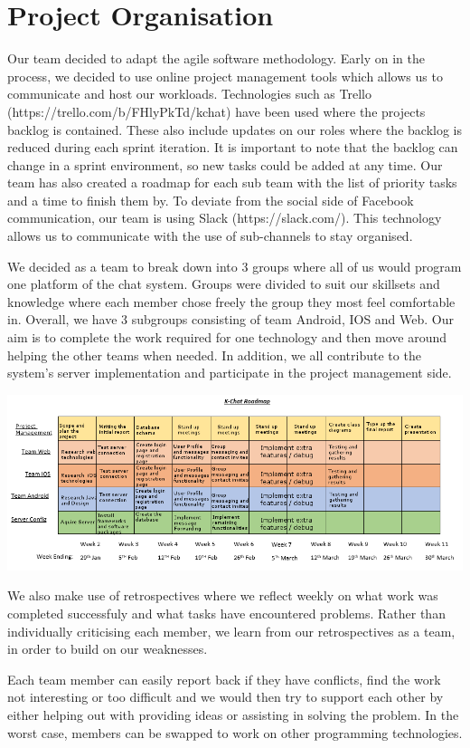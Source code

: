 \documentclass{article}
\begin{document}
    \section{Project Organisation}
	Our team decided to adapt the agile software methodology. Early on in the process, we decided to use online project management tools which allows us to communicate and host our workloads. Technologies such as Trello (https://trello.com/b/FHlyPkTd/kchat) have been used where the projects backlog is contained. These also include updates on our roles where the backlog is reduced during each sprint iteration. It is important to note that the backlog can change in a sprint environment, so new tasks could be added at any time.  Our team has also created a roadmap for each sub team with the list of priority tasks and a time to finish them by. To deviate from the social side of Facebook communication, our team is using Slack (https://slack.com/). This technology allows us to communicate with the use of sub-channels to stay organised.\\ \par 
	We decided as a team to break down into 3 groups where all of us would program one platform of the chat system. Groups were divided to suit our skillsets and knowledge where each member chose freely the group they most feel comfortable in. Overall, we have 3 subgroups consisting of team Android, IOS and Web. Our aim is to complete the work required for one technology and then move around helping the other teams when needed. In addition, we all contribute to the system's server implementation and participate in the project management side.\\ \par 
	
	\includegraphics[width=\textwidth]{roadmapkchat.png}
	
	We also make use of retrospectives where we reflect weekly on what work was completed successfuly and what tasks have encountered problems. Rather than individually criticising each member, we learn from our retrospectives as a team, in order to build on our weaknesses.\\ \par 
	Each team member can easily report back if they have conflicts, find the work not interesting or too difficult and we would then try to support each other by either helping out with providing ideas or assisting in solving the problem. In the worst case, members can be swapped to work on other programming technologies.
	
	
	
	
	
	
\end{document}
